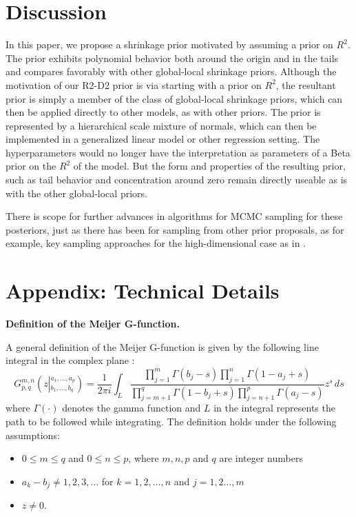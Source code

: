 \documentclass[12pt]{article}
\begin{document}
\section{Discussion}

In this paper, we propose a  shrinkage prior motivated by assuming a prior on $R^2$. The prior exhibits polynomial behavior both around the origin and in the tails and compares favorably with other global-local shrinkage priors. Although the motivation of our R2-D2 prior is via starting with a prior on $R^2$, the resultant prior is simply a member of the class of global-local shrinkage priors, which can then be applied directly to other models, as with other priors. The prior is represented by a hierarchical scale mixture of normals, which can then be implemented in a generalized linear model or other regression setting. The hyperparameters would no longer have the interpretation as parameters of a Beta prior on the $R^2$ of the model. But the form and properties of the resulting prior, such as tail behavior and concentration around zero remain directly useable as is with the other global-local priors.

There is scope for further advances in algorithms for MCMC sampling for these posteriors, just as there has been for sampling from other prior proposals, as for example, key sampling approaches for the high-dimensional case as in \cite{Bhatt2016sampling}.




% 

\clearpage
\appendix
\section{Appendix: Technical Details}

\textbf{Definition of the Meijer G-function.}

A general definition of the Meijer G-function is given by the following line integral in the complex plane \citep{bateman1953higher}:
\[
G^{m,n}_{p,q}\left(z \left\vert^{a_1, \dots, a_p}_{b_1,\dots, b_q} \right. \right ) = \frac{1}{2\pi i } \int_L \frac{\prod_{j=1}^m \Gamma(b_j-s)\prod_{j=1}^n \Gamma(1-a_j+s)}{\prod_{j=m+1}^q \Gamma(1-b_j+s)\prod_{j=n+1}^p \Gamma(a_j-s) } z^s \, ds
\]
where $\Gamma(\cdot)$ denotes the gamma function and  $L$  in the integral represents the path to be followed while integrating. The definition holds under the following assumptions:
\begin{itemize}
	\item $0\leq m\leq q$ and $0\leq n \leq p$, where $m,n,p$ and $q$ are integer numbers
	\item $a_k-b_j\neq 1,2,3,\dots $ for $k=1,2,\dots,n$ and $j=1,2\dots,m$
	\item $z\neq 0$.
\end{itemize}
\end{document}
